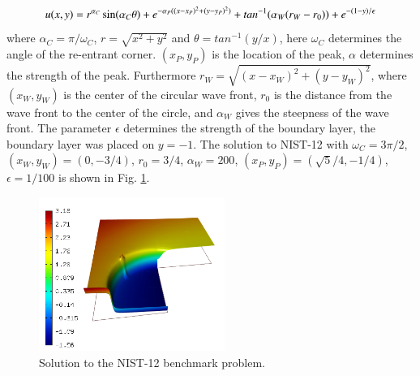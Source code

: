 \documentclass[12pt]{elsarticle}
\begin{document}
\[
u(x,y) =  r^{\alpha_{C} }\sin(\alpha_{C} \theta)
+ e^{-\alpha_{P} ((x - x_{P})^{2} + (y - y_{P})^{2})}
+ tan^{-1}(\alpha_{W} (r_{W} - r_{0})) \\
+ e^{-(1 - y) / \epsilon}
\]
where $\alpha_C = \pi / \omega_C$, $r = \sqrt{x^2+y^2}$
and $\theta = tan^{-1}(y/x)$, here $\omega_C$ determines
the angle of the re-entrant corner.
$(x_{P}, y_{P})$ is the location of the peak, $\alpha$
determines the strength of the peak. Furthermore
$r_{W} = \sqrt{(x - x_{W})^{2} + (y - y_{W})^{2}}$,
where $(x_{W}, y_{W})$ is the center of the circular wave front,
$r_{0}$ is the distance from the wave front to the
center of the circle, and $\alpha_W$ gives
the steepness of the wave front. The parameter $\epsilon$ determines the
strength of the boundary layer, the boundary layer was placed on $y = -1$.
The solution to NIST-12 with $\omega_C = 3 \pi /2$,
$(x_{W}, y_{W}) = (0, -3/4)$, $r_{0} = 3/4$, $\alpha_{W} = 200$,
$(x_{P}, y_{P}) = (\sqrt{5} / 4, -1/4)$,
$\epsilon = 1/100$ is shown in Fig. \ref{fig:sln-nist12}.

\begin{figure}[H]
\centering
\includegraphics[height=5cm]{nist/nist-12/solution.png}
\vspace{-3mm}
\caption{Solution to the NIST-12 benchmark problem.}
\vspace{-4mm}
\label{fig:sln-nist12}
\end{figure}
\end{document}

